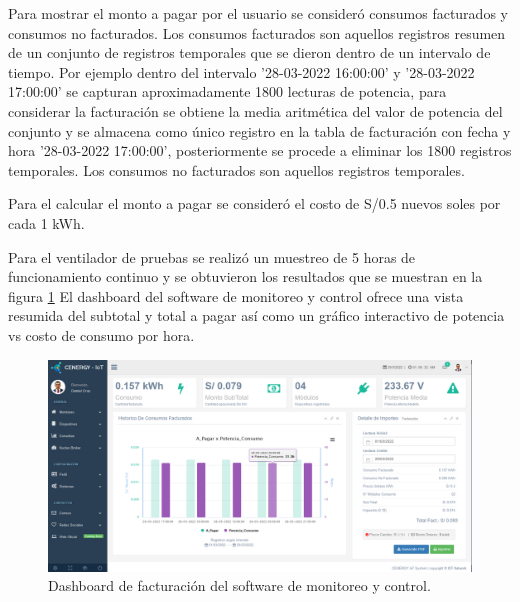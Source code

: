 Para mostrar el monto a pagar por el usuario se consideró consumos facturados y consumos no facturados. Los consumos facturados son aquellos registros resumen de un conjunto de registros temporales que se dieron dentro de un intervalo de tiempo. Por ejemplo dentro del intervalo '28-03-2022 16:00:00' y '28-03-2022 17:00:00' se capturan aproximadamente 1800 lecturas de potencia, para considerar la facturación se obtiene la media aritmética del valor de potencia del conjunto y se almacena como único registro en la tabla de facturación con fecha y hora '28-03-2022 17:00:00', posteriormente se procede a eliminar los 1800 registros temporales. Los consumos no facturados son aquellos registros temporales.

Para el calcular el monto a pagar se consideró el costo de S/0.5 nuevos soles por cada 1 kWh.

Para el ventilador de pruebas se realizó un muestreo de 5 horas de funcionamiento continuo y se obtuvieron los resultados que se muestran en la figura \ref{fig:dashboard-consumo} El dashboard del software de monitoreo y control ofrece una vista resumida del subtotal y total a pagar así como un gráfico interactivo de potencia vs costo de consumo por hora.


\begin{landscape} %
\begin{figure}[htpb]
\centering 
\includegraphics[width=1.7\textwidth]{./Figures/test/consumo/consumo.png}
\caption{Dashboard de facturación del software de monitoreo y control.}
\label{fig:dashboard-consumo}
\end{figure}
\end{landscape} %

















